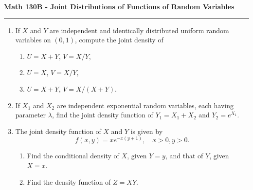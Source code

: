 \documentclass[11pt,letterpaper]{report}
\begin{document}
\begin{center}
{\bf \Large Math 130B - Joint Distributions of Functions of Random Variables}
\vspace{0.2cm}
\hrule
\end{center}

\begin{enumerate}
	\item If $X$ and $Y$ are independent and identically distributed uniform random variables on $(0,1)$, compute the joint density of
	\begin{enumerate}
		\item $U =X+Y$, $V = X/Y$,
		\item $U = X$, $V = X/Y$,
		\item $U = X+Y$, $V = X/(X+Y)$.
	\end{enumerate}

	\vfill

	\item If $X_1$ and $X_2$ are independent exponential random variables, each having parameter $\lambda$, find the joint density function of $Y_1 = X_1 + X_2$ and $Y_2 = e^{X_1}$.

	\vfill

	\item The joint density function of $X$ and $Y$ is given by
	\[
	f(x,y) = xe^{-x(y+1)},\quad x>0,y>0.
	\]
	\begin{enumerate}
		\item Find the conditional density of $X$, given $Y = y$, and that of $Y$, given $X = x$.
		\item Find the density function of $Z= XY$.
	\end{enumerate}

	\vfill
\end{enumerate}
\end{document}
